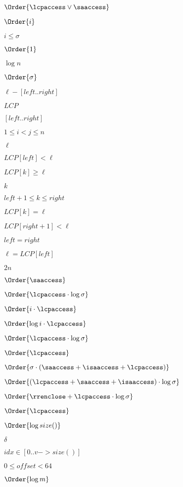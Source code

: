 \documentclass{article}
\begin{document}
$ \Order{\lcpaccess \vee \saaccess} $
\pagebreak

$ \Order{i} $
\pagebreak

$ i \leq \sigma $
\pagebreak

$ \Order{ 1 } $
\pagebreak

$ \log n $
\pagebreak

$ \Order{\sigma} $
\pagebreak

$\ell-[left..right]$
\pagebreak

$LCP$
\pagebreak

$[left..right]$
\pagebreak

$1\leq i<j\leq n$
\pagebreak

$\ell$
\pagebreak

$LCP[left]<\ell$
\pagebreak

$LCP[k]\geq \ell$
\pagebreak

$k$
\pagebreak

$left+1\leq k \leq right$
\pagebreak

$LCP[k] = \ell$
\pagebreak

$LCP[right+1]<\ell$
\pagebreak

$left=right$
\pagebreak

$\ell=LCP[left]$
\pagebreak

$2n$
\pagebreak

$ \Order{\saaccess} $
\pagebreak

$ \Order{\lcpaccess \cdot \log\sigma}$
\pagebreak

$ \Order{i \cdot \lcpaccess}$
\pagebreak

$\Order{\log i \cdot \lcpaccess}$
\pagebreak

$ \Order{\lcpaccess \cdot \log\sigma} $
\pagebreak

$ \Order{\lcpaccess} $
\pagebreak

$ \Order{ \sigma \cdot (\saaccess+\isaaccess+\lcpaccess) } $
\pagebreak

$ \Order{(\lcpaccess+\saaccess+\isaaccess) \cdot \log\sigma} $
\pagebreak

$ \Order{ \rrenclose + \lcpaccess \cdot \log\sigma} $
\pagebreak

$ \Order{\lcpaccess}$
\pagebreak

$ \Order{\log size()} $
\pagebreak

$\delta$
\pagebreak

$idx\in [0..v->size()]$
\pagebreak

$0\leq offset< 64$
\pagebreak

$ \Order{\log m} $
\pagebreak
\end{document}
